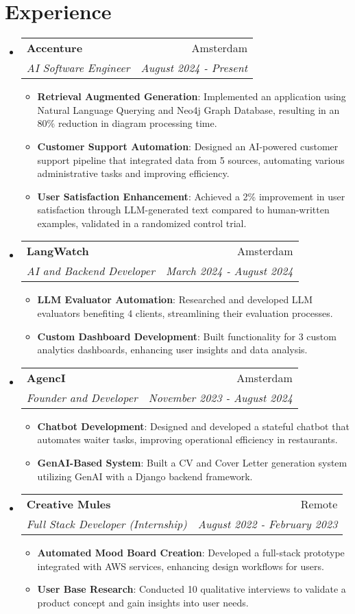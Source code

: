 \documentclass[a4paper,20pt]{article}
\makeatletter
\newcommand{\resumeItem}[2]{
  \item\small{
    \textbf{#1}{: #2 \vspace{-2pt}}
  }
}
\newcommand{\resumeSubheading}[4]{
  \vspace{-1pt}\item
    \begin{tabular*}{0.97\textwidth}{l@{\extracolsep{\fill}}r}
      \textbf{#1} & #2 \\
      \textit{#3} & \textit{#4} \\
    \end{tabular*}\vspace{-5pt}
}
\newcommand{\resumeSubHeadingListStart}{\begin{itemize}[leftmargin=*]}
\newcommand{\resumeSubHeadingListEnd}{\end{itemize}}
\newcommand{\resumeItemListStart}{\begin{itemize}}
\newcommand{\resumeItemListEnd}{\end{itemize}\vspace{-5pt}}
\makeatother
\begin{document}
\section{Experience}
  \resumeSubHeadingListStart
    \resumeSubheading{Accenture }{Amsterdam}
    {AI Software Engineer}{August 2024 - Present}
    \resumeItemListStart
    \resumeItem{Retrieval Augmented Generation}
          {Implemented an application using Natural Language Querying and Neo4j Graph Database, resulting in an 80\% reduction in diagram processing time.}
        \resumeItem{Customer Support Automation}
          {Designed an AI-powered customer support pipeline that integrated data from 5 sources, automating various administrative tasks and improving efficiency.}
        \resumeItem{User Satisfaction Enhancement}
          {Achieved a 2\% improvement in user satisfaction through LLM-generated text compared to human-written examples, validated in a randomized control trial.}
      \resumeItemListEnd
\vspace{-5pt}

    \resumeSubheading{LangWatch }{Amsterdam}
    {AI and Backend Developer}{March 2024 - August 2024}
    \resumeItemListStart
    \resumeItem{LLM Evaluator Automation}
          {Researched and developed LLM evaluators benefiting 4 clients, streamlining their evaluation processes.}
        \resumeItem{Custom Dashboard Development}
          {Built functionality for 3 custom analytics dashboards, enhancing user insights and data analysis.}
      \resumeItemListEnd
\vspace{-5pt}

    \resumeSubheading{AgencI }{Amsterdam}
    {Founder and Developer}{November 2023 - August 2024}
    \resumeItemListStart
    \resumeItem{Chatbot Development}
          {Designed and developed a stateful chatbot that automates waiter tasks, improving operational efficiency in restaurants.}
        \resumeItem{GenAI-Based System}
          {Built a CV and Cover Letter generation system utilizing GenAI with a Django backend framework.}
      \resumeItemListEnd
\vspace{-5pt}
    
    \resumeSubheading{Creative Mules }{Remote}
    {Full Stack Developer (Internship)}{August 2022 - February 2023}
    \resumeItemListStart
    \resumeItem{Automated Mood Board Creation}
          {Developed a full-stack prototype integrated with AWS services, enhancing design workflows for users.}
        \resumeItem{User Base Research}
          {Conducted 10 qualitative interviews to validate a product concept and gain insights into user needs.}
      \resumeItemListEnd
\vspace{-5pt}
\resumeSubHeadingListEnd
\end{document}
